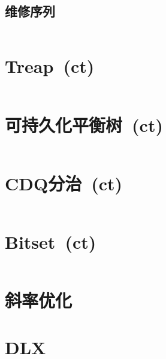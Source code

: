 	\subsection*{维修序列}
		\inputminted{cpp}{DataStructure/splay_arr.cpp}
\section{Treap\ \small(ct)}
	\inputminted{cpp}{DataStructure/treap.cpp}
\section{可持久化平衡树\ \small(ct)}
	\inputminted{cpp}{DataStructure/functional_treap.cpp}
\section{CDQ分治\ \small(ct)}
	\inputminted{cpp}{DataStructure/cdq_divide.cpp}
\section{Bitset\ \small(ct)}
	\inputminted{cpp}{DataStructure/bitset.cpp}
\section{斜率优化}
\section{DLX}